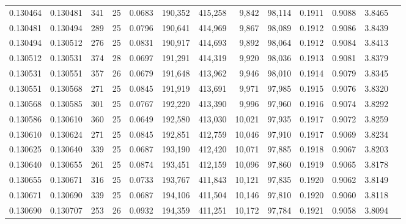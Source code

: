 \begin{tabular}{rrrrrrrrrrrrr}
0.130464 & 0.130481 &   341 &  25 &                                     0.0683 & 190,352 & 415,258 &   9,842 &  98,114 & 0.1911 & 0.9088 & 3.8465 \\
0.130481 & 0.130494 &   289 &  25 &                                     0.0796 & 190,641 & 414,969 &   9,867 &  98,089 & 0.1912 & 0.9086 & 3.8439 \\
0.130494 & 0.130512 &   276 &  25 &                                     0.0831 & 190,917 & 414,693 &   9,892 &  98,064 & 0.1912 & 0.9084 & 3.8413 \\
0.130512 & 0.130531 &   374 &  28 &                                     0.0697 & 191,291 & 414,319 &   9,920 &  98,036 & 0.1913 & 0.9081 & 3.8379 \\
0.130531 & 0.130551 &   357 &  26 &                                     0.0679 & 191,648 & 413,962 &   9,946 &  98,010 & 0.1914 & 0.9079 & 3.8345 \\
0.130551 & 0.130568 &   271 &  25 &                                     0.0845 & 191,919 & 413,691 &   9,971 &  97,985 & 0.1915 & 0.9076 & 3.8320 \\
0.130568 & 0.130585 &   301 &  25 &                                     0.0767 & 192,220 & 413,390 &   9,996 &  97,960 & 0.1916 & 0.9074 & 3.8292 \\
0.130586 & 0.130610 &   360 &  25 &                                     0.0649 & 192,580 & 413,030 &  10,021 &  97,935 & 0.1917 & 0.9072 & 3.8259 \\
0.130610 & 0.130624 &   271 &  25 &                                     0.0845 & 192,851 & 412,759 &  10,046 &  97,910 & 0.1917 & 0.9069 & 3.8234 \\
0.130625 & 0.130640 &   339 &  25 &                                     0.0687 & 193,190 & 412,420 &  10,071 &  97,885 & 0.1918 & 0.9067 & 3.8203 \\
0.130640 & 0.130655 &   261 &  25 &                                     0.0874 & 193,451 & 412,159 &  10,096 &  97,860 & 0.1919 & 0.9065 & 3.8178 \\
0.130655 & 0.130671 &   316 &  25 &                                     0.0733 & 193,767 & 411,843 &  10,121 &  97,835 & 0.1920 & 0.9062 & 3.8149 \\
0.130671 & 0.130690 &   339 &  25 &                                     0.0687 & 194,106 & 411,504 &  10,146 &  97,810 & 0.1920 & 0.9060 & 3.8118 \\
0.130690 & 0.130707 &   253 &  26 &                                     0.0932 & 194,359 & 411,251 &  10,172 &  97,784 & 0.1921 & 0.9058 & 3.8094 \\

\end{tabular}
